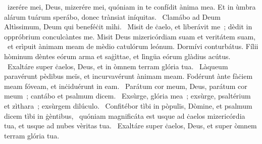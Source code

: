 { }
{%
~izerére mei, Deus, mizerére mei, quóniam in te confídit ànima mea. Et in ùmbra alárum tuárum sperábo, donec trànsiat iníquitas. 
~Clamábo ad Deum Altìssimum, Deum qui beneféċit mìhi. 
~Misit de ċaelo, et liberávit me~; dèdit in oppróbrium conculcàntes me. Misit Deus mizericórdiam suam et veritátem suam, 
~et erìpuit ànimam meam de mèdio catulórum leónum. Dormívi conturbátus. Fílii hòminum dèntes eórum arma et saġìttae, et lìngüa eórum glàdius acútus. 
~Exaltáre super ċaelos, Deus, et in òmnem terram glória tua. 
~Làqueum paravérunt pèdibus meïs, et incurvavérunt ànimam meam. Fodérunt ànte fàċiem meam fóveam, et inċiduérunt in eam. 
~Parátum cor meum, Deus, parátum cor meum~; cantábo et psalmum dicem. 
~Exsùrge, glória mea~; exsùrge, psaltérium et zìthara~; exsùrgem dilúculo. 
~Confitébor tìbi in pòpulïs, Dòmine, et psalmum dicem tìbi in ġèntibus, 
~quóniam magnificáta est usque ad ċaelos mizericórdia tua, et usque ad nubes vèritas tua. 
~Exaltáre super ċaelos, Deus, et super òmnem terram glória tua. 
}
